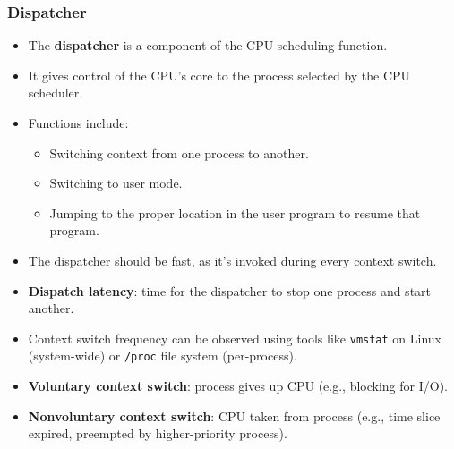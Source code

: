 \subsubsection{Dispatcher}
\begin{itemize}
    \item The \textbf{dispatcher} is a component of the CPU-scheduling function.
    \item It gives control of the CPU's core to the process selected by the CPU scheduler.
    \item Functions include:
        \begin{itemize}
            \item Switching context from one process to another.
            \item Switching to user mode.
            \item Jumping to the proper location in the user program to resume that program.
        \end{itemize}
    \item The dispatcher should be fast, as it's invoked during every context switch.
    \item \textbf{Dispatch latency}: time for the dispatcher to stop one process and start another.
    \item Context switch frequency can be observed using tools like \texttt{vmstat} on Linux (system-wide) or \texttt{/proc} file system (per-process).
    \item \textbf{Voluntary context switch}: process gives up CPU (e.g., blocking for I/O).
    \item \textbf{Nonvoluntary context switch}: CPU taken from process (e.g., time slice expired, preempted by higher-priority process).
\end{itemize}

